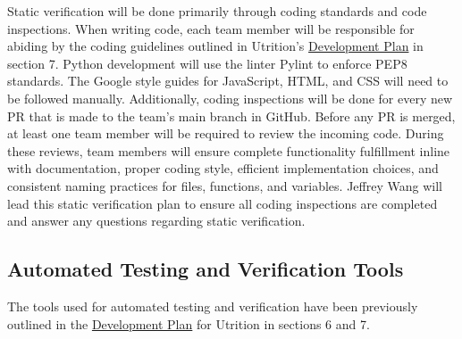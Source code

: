 \documentclass[12pt, titlepage]{article}
\begin{document}
	Static verification will be done primarily through coding standards and code inspections. When writing code, each team member will be responsible for abiding by the coding guidelines outlined in Utrition's \href{https://github.com/jeff-rey-wang/utrition/blob/dff32f8ddc662d07db9bd74e0b3705aa657dae6e/docs/DevelopmentPlan/DevelopmentPlan.pdf}{Development Plan} in section 7. Python development will use the linter Pylint to enforce PEP8 standards. The Google style guides for JavaScript, HTML, and CSS will need to be followed manually. Additionally, coding inspections will be done for every new PR that is made to the team's main branch in GitHub. Before any PR is merged, at least one team member will be required to review the incoming code. During these reviews, team members will ensure complete functionality fulfillment inline with documentation, proper coding style, efficient implementation choices, and consistent naming practices for files, functions, and variables. Jeffrey Wang will lead this static verification plan to ensure all coding inspections are completed and answer any questions regarding static verification.
	
	\subsection{Automated Testing and Verification Tools}
	
	
	
	
	The tools used for automated testing and verification have been previously outlined in the \href{https://github.com/jeff-rey-wang/utrition/blob/dff32f8ddc662d07db9bd74e0b3705aa657dae6e/docs/DevelopmentPlan/DevelopmentPlan.pdf}{Development Plan} for Utrition in sections 6 and 7. 
	
\end{document}
